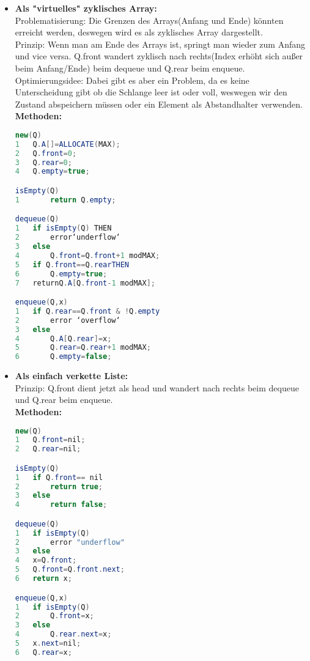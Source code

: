 \documentclass[jou,apacite]{apa6}
\begin{document}
\begin{itemize}
\item {\bfseries Als "virtuelles" zyklisches Array:} \\
Problematisierung: Die Grenzen des Arrays(Anfang und Ende) könnten erreicht werden, 
deswegen wird es als zyklisches Array dargestellt. \\
Prinzip: Wenn man am Ende des Arrays ist, springt man wieder zum Anfang und vice versa. Q.front wandert zyklisch nach rechts(Index erhöht sich außer beim Anfang/Ende) beim dequeue und Q.rear beim enqueue. \\
Optimierungsidee: Dabei gibt es aber ein Problem, da es keine Unterscheidung gibt ob die Schlange leer ist oder voll, weswegen wir den Zustand abspeichern müssen oder ein Element als Abstandhalter verwenden. \\
{\bfseries Methoden:} 
\begin{lstlisting}[language=java]
new(Q)
1   Q.A[]=ALLOCATE(MAX);
2   Q.front=0;
3   Q.rear=0;
4   Q.empty=true;

isEmpty(Q)
1       return Q.empty;

dequeue(Q)
1   if isEmpty(Q) THEN
2       error‘underflow‘
3   else 
4       Q.front=Q.front+1 modMAX;
5   if Q.front==Q.rearTHEN
6       Q.empty=true;
7   returnQ.A[Q.front-1 modMAX];

enqueue(Q,x)
1   if Q.rear==Q.front & !Q.empty
2       error ‘overflow‘
3   else 
4       Q.A[Q.rear]=x;
5       Q.rear=Q.rear+1 modMAX;
6       Q.empty=false;
\end{lstlisting}
\item {\bfseries Als einfach verkette Liste:}\\
Prinzip: Q.front dient jetzt als head und wandert nach rechts beim dequeue und Q.rear beim enqueue. \\
{\bfseries Methoden:} 
\begin{lstlisting}[language=java]
new(Q)
1   Q.front=nil;
2   Q.rear=nil;

isEmpty(Q)
1   if Q.front== nil
2       return true;
3   else 
4       return false;

dequeue(Q)
1   if isEmpty(Q) 
2       error "underflow"
3   else
4   x=Q.front;
5   Q.front=Q.front.next;
6   return x;

enqueue(Q,x)
1   if isEmpty(Q) 
2       Q.front=x;
3   else
4       Q.rear.next=x; 
5   x.next=nil;
6   Q.rear=x;
\end{lstlisting}
\end{itemize}
\end{document}
